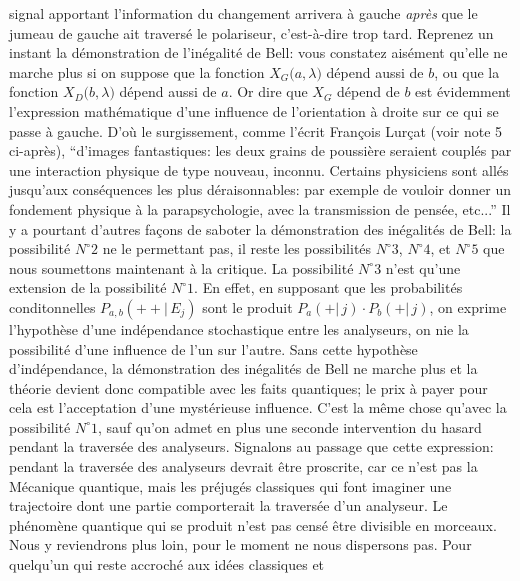 signal apportant l'information du changement arrivera \`a gauche
{\it apr\`es} que le  jumeau de gauche ait travers\'e
le polariseur, c'est-\`a-dire trop tard. 
\medskip 
Reprenez un instant la d\'emonstration de l'in\'egalit\'e de Bell: 
vous constatez ais\'ement qu'elle ne marche plus si on suppose que la
fonction $X_G\big( a,\lambda \big)$ d\'epend aussi de $b$,  ou que la
fonction $X_D\big( b,\lambda \big)$
d\'epend aussi de $a$.
\medskip
Or dire que $X_G$ d\'epend de $b$ est \'evidemment l'expression
math\'ematique d'une influence de l'orientation \`a droite sur
ce qui se passe \`a gauche.  D'o\`u le surgissement,  comme l'\'ecrit
Fran\c{c}ois Lur\c{c}at (voir note 5 ci-apr\`es),  ``d'images
fantastiques:  les deux grains de poussi\`ere seraient coupl\'es
par une interaction physique de type nouveau,  inconnu. 
Certains physiciens sont all\'es jusqu'aux cons\'equences les plus
d\'eraisonnables:  par exemple de vouloir donner un fondement
physique \`a la parapsychologie,  avec la transmission de pens\'ee, 
etc...''
\medskip
Il y a pourtant d'autres fa\c{c}ons de saboter la d\'emonstration
des in\'egalit\'es de Bell:  la possibilit\'e $N^\circ 2$ ne le permettant
pas,  il reste les possibilit\'es $N^\circ 3$, $N^\circ 4$, et $N^\circ 5$
que nous soumettons maintenant \`a la critique. 
\medskip
La possibilit\'e $N^\circ 3$ n'est qu'une extension de la possibilit\'e
$N^\circ 1$.  En effet,  en supposant que les probabilit\'es conditonnelles
$P_{a,b}(++ |\, E_j)$ sont le produit $P_{a}(+ |\, j)
\cdot P_{b}(+ |\, j)$,  on exprime l'hypoth\`ese d'une
ind\'ependance stochastique entre les analyseurs,  on nie la
possibilit\'e d'une influence de l'un sur l'autre.  Sans cette
hypoth\`ese d'ind\'ependance,  la d\'emonstration des
in\'egalit\'es de Bell ne marche plus et la th\'eorie devient
donc compatible avec les faits quantiques;  le prix \`a payer
pour cela est l'acceptation d'une myst\'erieuse influence. 
C'est la m\^eme chose qu'avec la possibilit\'e $N^\circ 1$, 
sauf qu'on admet en plus une seconde intervention du hasard
pendant la travers\'ee des analyseurs.  
\medskip
Signalons au passage que cette expression: {\og pendant la
travers\'ee des analyseurs\fg} devrait \^etre proscrite,  car
ce n'est pas la M\'ecanique quantique,  mais les pr\'ejug\'es
classiques qui font imaginer une trajectoire dont une partie
comporterait la travers\'ee d'un analyseur.  Le ph\'enom\`ene
quantique qui se produit n'est pas cens\'e \^etre divisible
en morceaux.  Nous y reviendrons plus loin,  pour le moment
ne nous dispersons pas. 
\medskip
Pour quelqu'un qui reste accroch\'e aux id\'ees classiques et
